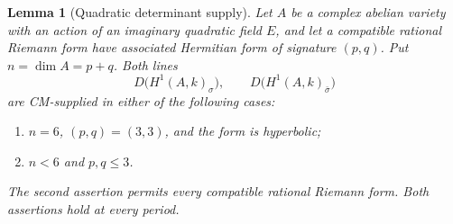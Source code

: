 \documentclass[11pt]{article}
\newtheorem{lemma}[theorem]{Lemma}
\numberwithin{equation}{section}
\begin{document}
\begin{lemma}[Quadratic determinant supply]
\label{p3ab:determinant-supply}
Let \(A\) be a complex abelian variety with an action of an imaginary
quadratic field \(E\), and let a compatible rational Riemann form
have associated Hermitian form of signature \((p,q)\).
Put \(n=\dim A=p+q\).  Both lines
\[
 D\bigl(H^1(A,k)_\sigma\bigr),\qquad
 D\bigl(H^1(A,k)_{\bar\sigma}\bigr)
\]
are CM-supplied in either of the following cases:
\begin{enumerate}
\item \(n=6\), \((p,q)=(3,3)\), and the form is hyperbolic;
\item \(n<6\) and \(p,q\leq3\).
\end{enumerate}
The second assertion permits every compatible rational Riemann form.
Both assertions hold at every period.
\end{lemma}
\end{document}
